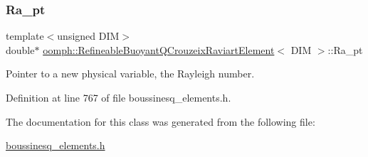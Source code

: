 \subsubsection{\texorpdfstring{Ra\+\_\+pt}{Ra\_pt}}
{\footnotesize\ttfamily template$<$unsigned D\+IM$>$ \\
double$\ast$ \hyperlink{classoomph_1_1RefineableBuoyantQCrouzeixRaviartElement}{oomph\+::\+Refineable\+Buoyant\+Q\+Crouzeix\+Raviart\+Element}$<$ D\+IM $>$\+::Ra\+\_\+pt\hspace{0.3cm}{\ttfamily [private]}}



Pointer to a new physical variable, the Rayleigh number. 



Definition at line 767 of file boussinesq\+\_\+elements.\+h.



The documentation for this class was generated from the following file\+:\begin{DoxyCompactItemize}
\item 
\hyperlink{boussinesq__elements_8h}{boussinesq\+\_\+elements.\+h}\end{DoxyCompactItemize}
